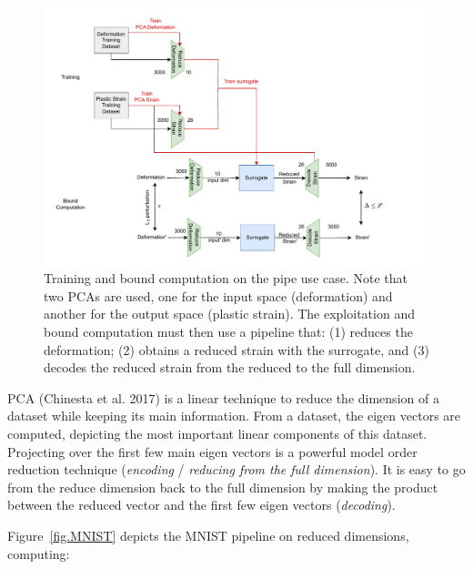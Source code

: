 \begin{figure}[h!]
    \centering
    \includegraphics[scale=0.9]{PIPE.pdf} \hspace{1.5cm}
    \caption{Training and bound computation on the pipe use case. 
    Note that two PCAs are used, one for the input space (deformation) and another for the output space (plastic strain). The exploitation and bound computation must then use a pipeline that: (1) reduces the deformation; (2) obtains a reduced strain with the surrogate, and (3) decodes the reduced strain from the reduced to the full dimension.}
    \label{fig.PIPE}
\end{figure}	


PCA (Chinesta et al. 2017) is a linear technique to reduce the dimension of a dataset while keeping its main information.
From a dataset, the eigen vectors are computed, depicting the most important linear components of this dataset.
Projecting over the first few main eigen vectors is a powerful model order reduction technique ({\em encoding} / {\em reducing from the full dimension}). 
It is easy to go from the reduce dimension back to the full dimension
by making the product between the reduced vector and the first few eigen vectors ({\em decoding}).

Figure~\ref{fig.MNIST} depicts the MNIST pipeline on reduced dimensions, computing:

